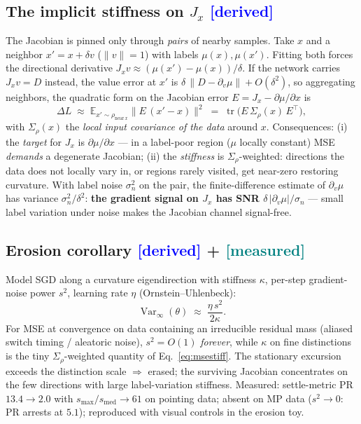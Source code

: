 \documentclass[10pt]{article}
\newcommand{\tagd}{{\small\textcolor{blue}{[derived]}}}
\newcommand{\tagm}{{\small\textcolor{teal}{[measured]}}}
\begin{document}
\subsection{The implicit stiffness on $J_x$ \hfill \tagd}
The Jacobian is pinned only through \emph{pairs} of nearby samples. Take $x$
and a neighbor $x' = x+\delta v$ ($\|v\|=1$) with labels $\mu(x),\mu(x')$.
Fitting both forces the directional derivative
$J_x v \approx (\mu(x')-\mu(x))/\delta$. If the network carries $J_x v = D$
instead, the value error at $x'$ is $\delta\,\|D-\partial_v\mu\|+O(\delta^2)$,
so aggregating neighbors, the quadratic form on the Jacobian error
$E = J_x - \partial\mu/\partial x$ is
\begin{equation}
\Delta L \;\approx\; \mathbb{E}_{x'\sim\rho_{\mathrm{near}\,x}}
\big\|E\,(x'-x)\big\|^{2}
\;=\;\operatorname{tr}\!\big(E\,\Sigma_\rho(x)\,E^{\top}\big),
\label{eq:msestiff}
\end{equation}
with $\Sigma_\rho(x)$ the \emph{local input covariance of the data} around
$x$. Consequences: (i) the \emph{target} for $J_x$ is $\partial\mu/\partial x$
--- in a label-poor region ($\mu$ locally constant) MSE \emph{demands} a
degenerate Jacobian; (ii) the \emph{stiffness} is $\Sigma_\rho$-weighted:
directions the data does not locally vary in, or regions rarely visited, get
near-zero restoring curvature. With label noise $\sigma_n^{2}$ on the pair,
the finite-difference estimate of $\partial_v\mu$ has variance
$\sigma_n^{2}/\delta^{2}$: \textbf{the gradient signal on $J_x$ has SNR
$\delta\,|\partial_v\mu|/\sigma_n$} --- small label variation under noise
makes the Jacobian channel signal-free.

\subsection{Erosion corollary \hfill \tagd{} + \tagm}
\label{sec:ou}
Model SGD along a curvature eigendirection with stiffness $\kappa$, per-step
gradient-noise power $s^{2}$, learning rate $\eta$ (Ornstein--Uhlenbeck):
\begin{equation}
\operatorname{Var}_{\infty}(\theta) \;\approx\; \frac{\eta\,s^{2}}{2\kappa}.
\label{eq:ou}
\end{equation}
For MSE at convergence on data containing an irreducible residual mass
(aliased switch timing / aleatoric noise), $s^{2}=O(1)$ \emph{forever}, while
$\kappa$ on fine distinctions is the tiny $\Sigma_\rho$-weighted quantity of
Eq.~\eqref{eq:msestiff}. The stationary excursion exceeds the distinction
scale $\Rightarrow$ erased; the surviving Jacobian concentrates on the few
directions with large label-variation stiffness. Measured: settle-metric PR
$13.4\!\to\!2.0$ with $s_{\max}/s_{\mathrm{med}}\!\to\!61$ on pointing data;
absent on MP data ($s^{2}\!\to\!0$: PR arrests at $5.1$); reproduced with
visual controls in the erosion toy.
\end{document}
